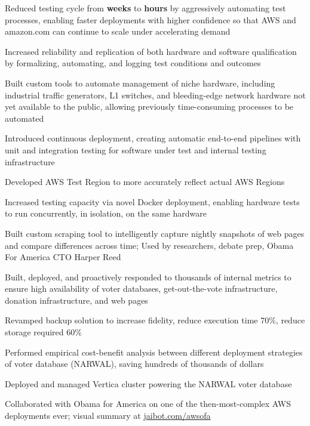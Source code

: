 \documentclass[]{resume}
\begin{document}
\begin{minipage}[t]{0.66\textwidth}
\begin{tightemize}
\item Reduced testing cycle from \textbf{weeks} to \textbf{hours} by aggressively automating test processes, enabling faster deployments with higher confidence so that AWS and amazon.com can continue to scale under accelerating demand
\item Increased reliability and replication of both hardware and software qualification by formalizing, automating, and logging test conditions and outcomes
\item Built custom tools to automate management of niche hardware, including industrial traffic generators, L1 switches, and bleeding-edge network hardware not yet available to the public, allowing previously time-consuming processes to be automated
\item Introduced continuous deployment, creating automatic end-to-end pipelines with unit and integration testing for software under test and internal testing infrastructure
\item Developed AWS Test Region to more accurately reflect actual AWS Regions
\item Increased testing capacity via novel Docker deployment, enabling hardware tests to run concurrently, in isolation, on the same hardware
\end{tightemize}
\sectionsep

\descript{}
\begin{tightemize}
\item Built custom scraping tool to intelligently capture nightly snapshots of web pages and compare differences across time; Used by researchers, debate prep, Obama For America CTO Harper Reed
\item Built, deployed, and proactively responded to thousands of internal metrics to ensure high availability of voter databases, get-out-the-vote infrastructure, donation infrastructure, and web pages
\item Revamped backup solution to increase fidelity, reduce execution time 70\%, reduce storage required 60\%
\item Performed empirical cost-benefit analysis between different deployment strategies of voter database (NARWAL), saving hundreds of thousands of dollars
\item Deployed and managed Vertica cluster powering the NARWAL voter database
\item Collaborated with Obama for America on one of the then-most-complex AWS deployments ever; visual summary at \href{http://www.jaibot.com/awsofa}{jaibot.com/awsofa}
\end{tightemize}
\sectionsep


\end{minipage}
\end{document}
